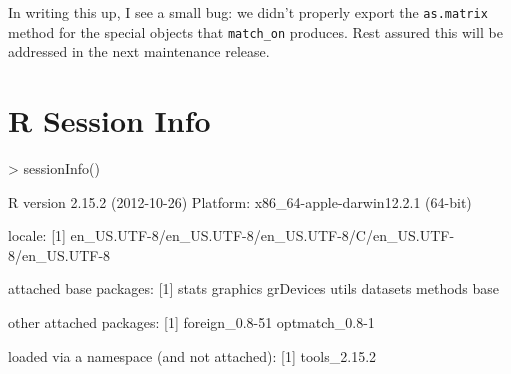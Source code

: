 \documentclass{article}
\begin{document}
In writing this up, I see a small bug: we didn't properly export the
\texttt{as.matrix} method for the special objects that \texttt{match\_on}
produces. Rest assured this will be addressed in the next maintenance release.
\appendix

\section{R Session Info}

\begin{Schunk}
\begin{Sinput}
> sessionInfo()
\end{Sinput}
\begin{Soutput}
R version 2.15.2 (2012-10-26)
Platform: x86_64-apple-darwin12.2.1 (64-bit)

locale:
[1] en_US.UTF-8/en_US.UTF-8/en_US.UTF-8/C/en_US.UTF-8/en_US.UTF-8

attached base packages:
[1] stats     graphics  grDevices utils     datasets  methods   base     

other attached packages:
[1] foreign_0.8-51 optmatch_0.8-1

loaded via a namespace (and not attached):
[1] tools_2.15.2
\end{Soutput}
\end{Schunk}
\end{document}
